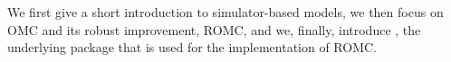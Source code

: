 We first give a short introduction to simulator-based models, we then
focus on OMC and its robust improvement, ROMC, and we, finally,
introduce , the underlying package that is used for the
implementation of ROMC.
